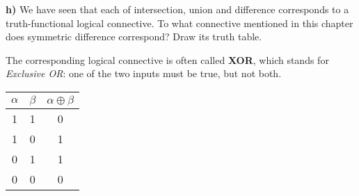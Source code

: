\documentclass[titlepage, letterpaper, fleqn]{article}
\newcommand{\spacepls}{\vspace{5mm}}
\begin{document}
\spacepls

{\large \textbf{h)} We have seen that each of intersection, union and difference corresponds to a truth-functional logical connective. To what connective mentioned in this chapter does symmetric difference correspond? Draw its truth table.}

\spacepls

The corresponding logical connective is often called \textbf{XOR}, which stands for \textit{Exclusive OR}: one of the two inputs must be true, but not both.

\begin{table}[h!]
\centering
\begin{tabular}{@{}ccc@{}}
\toprule
$\alpha$ & $\beta$ & $\alpha \oplus \beta$ \\ \midrule
1 & 1 & 0 \\
1 & 0 & 1 \\
0 & 1 & 1 \\
0 & 0 & 0 \\ \bottomrule
\end{tabular}
\end{table}
\end{document}
